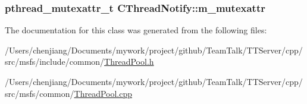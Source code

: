 \subsubsection[{m\+\_\+mutexattr}]{\setlength{\rightskip}{0pt plus 5cm}pthread\+\_\+mutexattr\+\_\+t C\+Thread\+Notify\+::m\+\_\+mutexattr\hspace{0.3cm}{\ttfamily [private]}}\label{class_c_thread_notify_a9a70b8192eac3bb5eb661fc28047dfd3}


The documentation for this class was generated from the following files\+:\begin{DoxyCompactItemize}
\item 
/\+Users/chenjiang/\+Documents/mywork/project/github/\+Team\+Talk/\+T\+T\+Server/cpp/src/msfs/include/common/\hyperlink{_thread_pool_8h}{Thread\+Pool.\+h}\item 
/\+Users/chenjiang/\+Documents/mywork/project/github/\+Team\+Talk/\+T\+T\+Server/cpp/src/msfs/common/\hyperlink{_thread_pool_8cpp}{Thread\+Pool.\+cpp}\end{DoxyCompactItemize}
